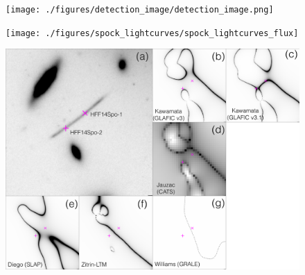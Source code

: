 
\begin{figure}[tbp]
\begin{center}
\texttt{[image: ./figures/detection\_image/detection\_image.png]}
\caption{ \protect}
\end{center}
\end{figure}

\begin{figure}[tbp]
\begin{center}
\texttt{[image: ./figures/spock\_lightcurves/spock\_lightcurves\_flux]}
\caption{ \protect}
\end{center}
\end{figure}

\begin{figure}[tbp]
  \begin{center}
    \includegraphics[width=\textwidth]{./figures/spock_critical_curves/spock_critical_curves}
    \caption{\protect}
  \end{center}
\end{figure}

